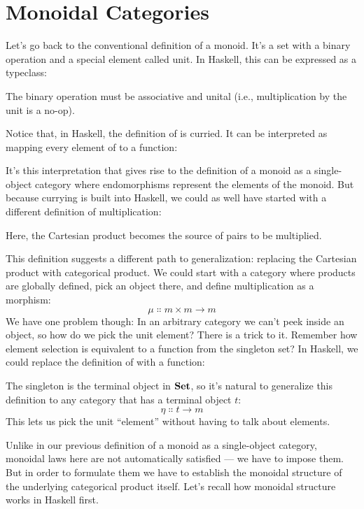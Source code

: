 \section{Monoidal Categories}

Let's go back to the conventional definition of a monoid. It's a set
with a binary operation and a special element called unit. In Haskell,
this can be expressed as a typeclass:

The binary operation  must be associative and unital
(i.e., multiplication by the unit  is a no-op).

Notice that, in Haskell, the definition of  is curried.
It can be interpreted as mapping every element of  to a
function:

It's this interpretation that gives rise to the definition of a monoid
as a single-object category where endomorphisms
 represent the elements of the monoid.
But because currying is built into Haskell, we could as well have
started with a different definition of multiplication:

Here, the Cartesian product  becomes the source of pairs
to be multiplied.

This definition suggests a different path to generalization: replacing
the Cartesian product with categorical product. We could start with a
category where products are globally defined, pick an object 
there, and define multiplication as a morphism:
\[\mu \Colon m\times{}m \to m\]
We have one problem though: In an arbitrary category we can't peek
inside an object, so how do we pick the unit element? There is a trick
to it. Remember how element selection is equivalent to a function from
the singleton set? In Haskell, we could replace the definition of
 with a function:

The singleton is the terminal object in $\mathbf{Set}$, so it's natural to
generalize this definition to any category that has a terminal object
$t$:
\[\eta \Colon t \to m\]
This lets us pick the unit ``element'' without having to talk about
elements.

Unlike in our previous definition of a monoid as a single-object
category, monoidal laws here are not automatically satisfied --- we have
to impose them. But in order to formulate them we have to establish the
monoidal structure of the underlying categorical product itself. Let's
recall how monoidal structure works in Haskell first.

